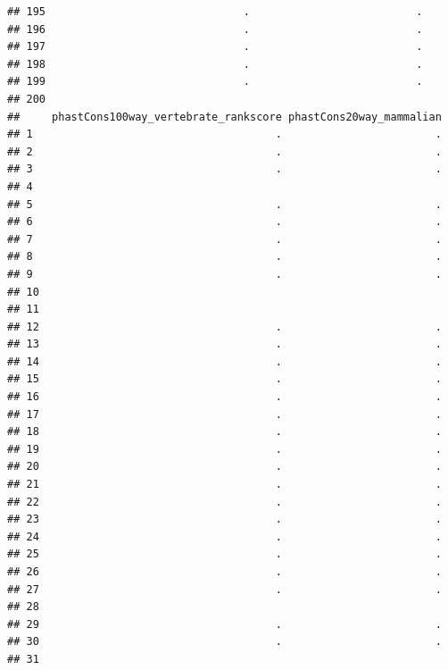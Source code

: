\documentclass[
]{article}
\begin{document}
\begin{verbatim}
## 195                               .                          .
## 196                               .                          .
## 197                               .                          .
## 198                               .                          .
## 199                               .                          .
## 200                                                           
##     phastCons100way_vertebrate_rankscore phastCons20way_mammalian
## 1                                      .                        .
## 2                                      .                        .
## 3                                      .                        .
## 4                                                                
## 5                                      .                        .
## 6                                      .                        .
## 7                                      .                        .
## 8                                      .                        .
## 9                                      .                        .
## 10                                                               
## 11                                                               
## 12                                     .                        .
## 13                                     .                        .
## 14                                     .                        .
## 15                                     .                        .
## 16                                     .                        .
## 17                                     .                        .
## 18                                     .                        .
## 19                                     .                        .
## 20                                     .                        .
## 21                                     .                        .
## 22                                     .                        .
## 23                                     .                        .
## 24                                     .                        .
## 25                                     .                        .
## 26                                     .                        .
## 27                                     .                        .
## 28                                                               
## 29                                     .                        .
## 30                                     .                        .
## 31                                                               

\end{verbatim}
\end{document}

